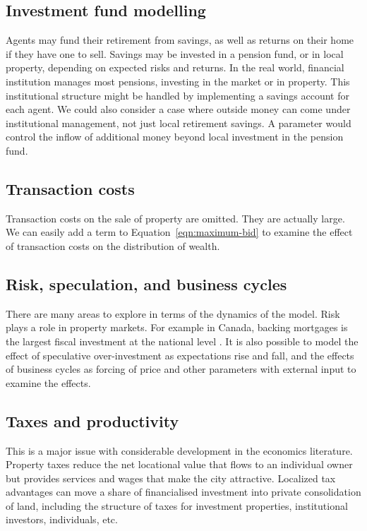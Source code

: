 \subsection{Investment fund modelling}
Agents may fund their retirement from savings, as well as returns on their home if they have one to sell. Savings may be invested in a pension fund, or in local property,  depending on expected risks and returns. In the real world, financial institution manages most pensions, investing in the market or in property.  This institutional structure might be handled by implementing a savings account for each agent. %
We could also consider a case where outside money can come under institutional management, not just local retirement savings. A parameter would control the inflow of additional money beyond local investment in the pension fund. 

\subsection{Transaction costs}
Transaction costs on the sale of property are omitted. They are actually large. We can easily add a term to  Equation~\ref{eqn:maximum-bid} to examine the effect of transaction costs on the distribution of wealth.


\subsection{Risk, speculation, and business cycles}

There are many areas to explore in terms of the dynamics of the model. Risk plays a role in property markets. For example in Canada, backing mortgages is the largest fiscal 
investment at the national level \cite{nemtinFinancializationHousingSocial2021}. It is also possible to model the effect of speculative over-investment as expectations rise and fall, and the effects of business cycles as forcing of price and other parameters with external input to examine the effects.

\subsection{Taxes and productivity} %
This is a major issue with considerable development in the economics literature. Property taxes reduce the net locational value that flows to an individual owner but provides services and wages that make the city attractive. 
Localized tax advantages can move a share of financialised investment into private consolidation of land, 
including the structure of taxes for investment properties, institutional investors, individuals, etc.

